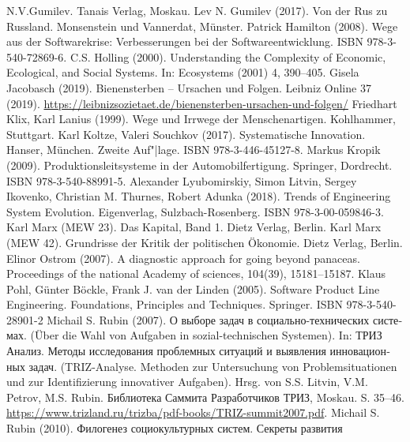 \documentclass[11pt,a4paper]{article}
\begin{document}
\begin{thebibliography}{xxx}
  N.V.Gumilev. Tanais Verlag, Moskau.
 Lev N. Gumilev (2017). Von der Rus zu Russland.
  Monsenstein und Vannerdat, Münster.
 Patrick Hamilton (2008). Wege aus der Softwarekrise:
  Verbesserungen bei der Softwareentwicklung. ISBN 978-3-540-72869-6.
 C.S. Holling (2000). Understanding the Complexity of
  Economic, Ecological, and Social Systems. In: Ecosystems (2001) 4, 390–405.
 Gisela Jacobasch (2019). Bienensterben -- Ursachen und
  Folgen.  Leibniz Online 37 (2019).
  \url{https://leibnizsozietaet.de/bienensterben-ursachen-und-folgen/}
 Friedhart Klix, Karl Lanius (1999). Wege und Irrwege
  der Menschenartigen.  Kohlhammer, Stuttgart.
 Karl Koltze, Valeri Souchkov (2017).
  Systematische Innovation.\\ Hanser, München. Zweite Auf"|lage. ISBN
  978-3-446-45127-8.
   Markus Kropik (2009). Produktionsleitsysteme in der
    Automobilfertigung. Springer, Dordrecht.\\ ISBN 978-3-540-88991-5.
 Alexander Lyubomirskiy, Simon Litvin, Sergey Ikovenko,
  Christian M. Thurnes, Robert Adunka (2018). Trends of Engineering System
  Evolution. Eigenverlag, Sulzbach-Rosenberg.  ISBN 978-3-00-059846-3.
 Karl Marx (MEW 23). Das Kapital, Band 1. Dietz Verlag, Berlin.
 Karl Marx (MEW 42). Grundrisse der Kritik der politischen
  Ökonomie.  Dietz Verlag, Berlin.
 Elinor Ostrom (2007). A diagnostic approach for going
  beyond panaceas.  Proceedings of the national Academy of sciences, 104(39),
  15181--15187.
 Klaus Pohl, Günter Böckle, Frank J. van der Linden (2005).
  Software Product Line Engineering. Foundations, Principles and Techniques.
  Springer. ISBN 978-3-540-28901-2
 Michail S. Rubin (2007). \foreignlanguage{russian}{О
  выборе задач в социально-технических системах}. (Über die Wahl von Aufgaben
  in sozial-technischen Systemen). In: \foreignlanguage{russian}{ТРИЗ Анализ.
    Методы исследования проблемных ситуаций и выявления инновационных
    задач}. (TRIZ-Analyse. Methoden zur Untersuchung von Problemsituationen
  und zur Identifizierung innovativer Aufgaben). Hrsg. von S.S. Litvin,
  V.M. Petrov, M.S. Rubin. \foreignlanguage{russian}{Библиотека Саммита
    Разработчиков ТРИЗ}, Moskau. S. 35--46.
  \url{https://www.trizland.ru/trizba/pdf-books/TRIZ-summit2007.pdf}.
 Michail S. Rubin (2010).
  \foreignlanguage{russian}{Филогенез социокультурных систем. Секреты развития
}
\end{thebibliography}
\end{document}
